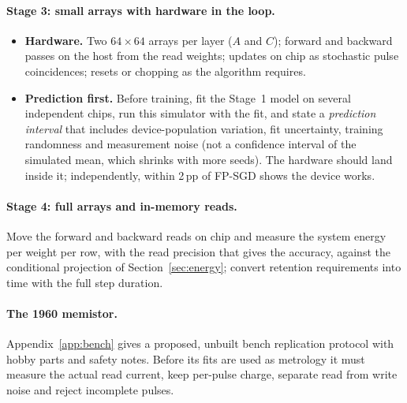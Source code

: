 \paragraph{Stage 3: small arrays with hardware in the loop.}
\begin{itemize}
\item \textbf{Hardware.} Two $64\times64$ arrays per layer ($A$ and $C$); forward and backward passes on the host from the read
      weights; updates on chip as stochastic pulse coincidences; resets or chopping as the algorithm requires.
\item \textbf{Prediction first.} Before training, fit the Stage~1 model on several independent chips, run this simulator with
      the fit, and state a \emph{prediction interval} that includes device-population variation, fit uncertainty, training
      randomness and measurement noise (not a confidence interval of the simulated mean, which shrinks with more seeds). The
      hardware should land inside it; independently, within 2\,pp of FP-SGD shows the device works.
\end{itemize}

\paragraph{Stage 4: full arrays and in-memory reads.} Move the forward and backward reads on chip and measure the system energy
per weight per row, with the read precision that gives the accuracy, against the conditional projection of
Section~\ref{sec:energy}; convert retention requirements into time with the full step duration.

\paragraph{The 1960 memistor.} Appendix~\ref{app:bench} gives a proposed, unbuilt bench replication protocol with hobby parts and
safety notes. Before its fits are used as metrology it must measure the actual read current, keep per-pulse charge, separate
read from write noise and reject incomplete pulses.

